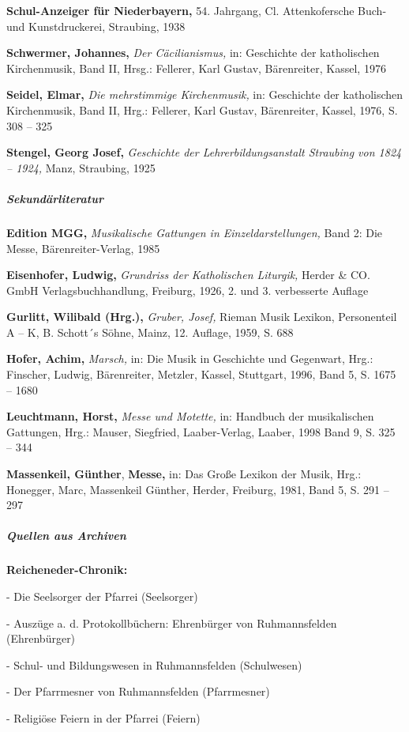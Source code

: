\documentclass[a4paper]{article}
\begin{document}
\textbf{Schul-Anzeiger für Niederbayern,} 54. Jahrgang, Cl.
Attenkofersche Buch- und Kunstdruckerei, Straubing, 1938

\textbf{Schwermer, Johannes,} \textit{Der Cäcilianismus,} in: Geschichte
der katholischen Kirchenmusik, Band II, Hrsg.: Fellerer, Karl Gustav,
Bärenreiter, Kassel, 1976

\textbf{Seidel, Elmar, }\textit{Die mehrstimmige Kirchenmusik,} in:
Geschichte der katholischen Kirchenmusik, Band II, Hrg.: Fellerer, Karl
Gustav, Bärenreiter, Kassel, 1976, S. 308 – 325

\textbf{Stengel, Georg Josef,} \textit{Geschichte der
Lehrerbildungsanstalt Straubing von 1824 – 1924, }Manz, Straubing, 1925

\subparagraph{Sekundärliteratur}
\textbf{Edition MGG,} \textit{Musikalische Gattungen in
Einzeldarstellungen,} Band 2: Die Messe, Bärenreiter-Verlag, 1985

\textbf{Eisenhofer, Ludwig,} \textit{Grundriss der Katholischen
Liturgik,} Herder \& CO. GmbH Verlagsbuchhandlung, Freiburg, 1926, 2.
und 3. verbesserte Auflage

\textbf{Gurlitt, Wilibald (Hrg.), }\textit{Gruber, Josef,} Rieman Musik
Lexikon, Personenteil A – K, B. Schott´s Söhne, Mainz, 12. Auflage,
1959, S. 688

\textbf{Hofer, Achim, }\textit{Marsch,} in: Die Musik in Geschichte und
Gegenwart, Hrg.: Finscher, Ludwig, Bärenreiter, Metzler, Kassel,
Stuttgart, 1996, Band 5, S. 1675 – 1680

\textbf{Leuchtmann, Horst,} \textit{Messe und Motette,} in: Handbuch der
musikalischen Gattungen, Hrg.: Mauser, Siegfried, Laaber-Verlag,
Laaber, 1998 Band 9, S. 325 – 344

\textbf{Massenkeil, Günther}, \textbf{Messe,} in: Das Große Lexikon der
Musik, Hrg.: Honegger, Marc, Massenkeil Günther, Herder, Freiburg,
1981, Band 5, S. 291 – 297

\subparagraph[Quellen aus Archiven]{Quellen aus Archiven}
{\bfseries
Reicheneder-Chronik:}

{}- Die Seelsorger der Pfarrei (Seelsorger)

{}- Auszüge a. d. Protokollbüchern: Ehrenbürger von Ruhmannsfelden
(Ehrenbürger)

{}- Schul- und Bildungswesen in Ruhmannsfelden (Schulwesen)

{}- Der Pfarrmesner von Ruhmannsfelden (Pfarrmesner)

{}- Religiöse Feiern in der Pfarrei (Feiern)
\end{document}
